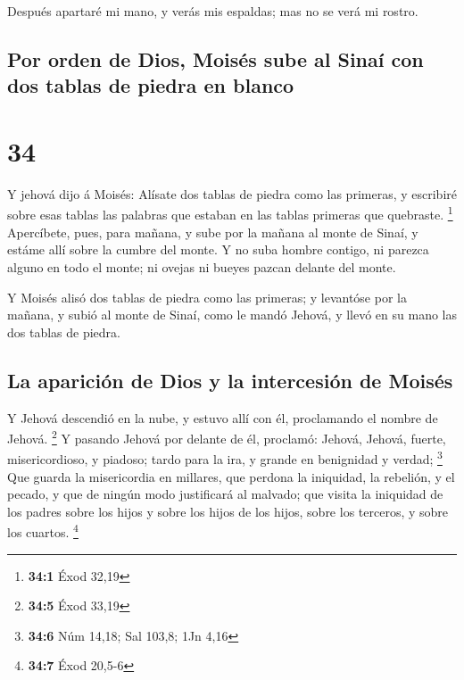  Después apartaré mi mano, y verás mis espaldas; mas no se
verá mi rostro.

\hypertarget{por-orden-de-dios-moisuxe9s-sube-al-sinauxed-con-dos-tablas-de-piedra-en-blanco}{%
\subsection{Por orden de Dios, Moisés sube al Sinaí con dos tablas de
piedra en
blanco}\label{por-orden-de-dios-moisuxe9s-sube-al-sinauxed-con-dos-tablas-de-piedra-en-blanco}}

\hypertarget{section-33}{%
\section{34}\label{section-33}}

 Y jehová dijo á Moisés: Alísate dos tablas de piedra como
las primeras, y escribiré sobre esas tablas las palabras que estaban en
las tablas primeras que quebraste. \footnote{\textbf{34:1} Éxod 32,19}
 Apercíbete, pues, para mañana, y sube por la mañana al
monte de Sinaí, y estáme allí sobre la cumbre del monte.  Y
no suba hombre contigo, ni parezca alguno en todo el monte; ni ovejas ni
bueyes pazcan delante del monte.

 Y Moisés alisó dos tablas de piedra como las primeras; y
levantóse por la mañana, y subió al monte de Sinaí, como le mandó
Jehová, y llevó en su mano las dos tablas de piedra.

\hypertarget{la-apariciuxf3n-de-dios-y-la-intercesiuxf3n-de-moisuxe9s}{%
\subsection{La aparición de Dios y la intercesión de
Moisés}\label{la-apariciuxf3n-de-dios-y-la-intercesiuxf3n-de-moisuxe9s}}

 Y Jehová descendió en la nube, y estuvo allí con él,
proclamando el nombre de Jehová. \footnote{\textbf{34:5} Éxod 33,19}
 Y pasando Jehová por delante de él, proclamó: Jehová,
Jehová, fuerte, misericordioso, y piadoso; tardo para la ira, y grande
en benignidad y verdad; \footnote{\textbf{34:6} Núm 14,18; Sal 103,8;
  1Jn 4,16}  Que guarda la misericordia en millares, que
perdona la iniquidad, la rebelión, y el pecado, y que de ningún modo
justificará al malvado; que visita la iniquidad de los padres sobre los
hijos y sobre los hijos de los hijos, sobre los terceros, y sobre los
cuartos. \footnote{\textbf{34:7} Éxod 20,5-6}


